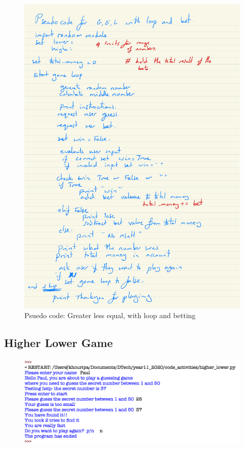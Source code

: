 \documentclass[a4paper,12pt]{article}
\begin{document}
\begin{figure} [!h]
	\centering
	\includegraphics[width=17cm]{iterative_processes/random_L_E_G_withbet.pdf}
	\caption*{Psuedo code: Greater less equal, with loop and betting}
\end{figure}

\newpage
\subsection{Higher Lower Game}
\begin{figure} [!h]
	\centering
	\includegraphics[width=17cm]{screen_shots/higher_lower.png}
\end{figure}
\end{document}
